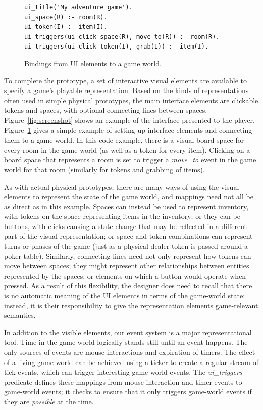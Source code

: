 \documentclass[letterpaper]{article}
\begin{document}
\begin{figure}
\begin{Verbatim}[frame=single,fontsize=\scriptsize]
ui_title('My adventure game').
ui_space(R) :- room(R).
ui_token(I) :- item(I).
ui_triggers(ui_click_space(R), move_to(R)) :- room(R).
ui_triggers(ui_click_token(I), grab(I)) :- item(I).
\end{Verbatim}
\caption{Bindings from UI elements to a game world.}
\label{fig:bindings}
\end{figure}

To complete the prototype, a set of interactive visual
elements are available to specify a game's playable representation. Based on
the kinds of representations often used in simple physical prototypes, the main
interface elements are clickable tokens and spaces, with optional connecting lines between
spaces. Figure~\ref{fig:screenshot} shows an example of the interface presented
to the player. Figure~\ref{fig:bindings} gives a simple example of setting up
interface elements and connecting them to a game world. In this
code example, there is a visual board space for every room in the game world (as well
as a token for every item).  Clicking on a board space that represents a room
is set to trigger a \emph{move\_to} event in the game world for that room (similarly for
tokens and grabbing of items).

As with actual physical prototypes, there are many ways of using the visual
elements to represent the state of the game world, and mappings need not all be
as direct as in this example. Spaces can instead be used to represent
inventory, with tokens on the space representing items in the inventory; or
they can be buttons, with clicks causing a state change that may be reflected
in a different part of the visual representation; or space and token
combinations can represent turns or phases of the game (just as a physical
dealer token is passed around a poker table). Similarly, connecting lines
need not only represent how tokens can move between spaces; they
might represent other relationships between entities represented by the spaces,
or elements on which a button would operate when pressed.  As a result of this
flexibility, the designer does need to recall that there is no automatic
meaning of the UI elements in terms of the game-world state: instead, it is
their responsibility to give the representation elements game-relevant
semantics.

In addition to the visible elements, our event system is a major
representational tool. Time in the game world logically stands still until an
event happens. The only sources of events are mouse interactions and expiration
of timers. The effect of a living game world can be achieved using a ticker to
create a regular stream of tick events, which can trigger interesting
game-world events. The \emph{ui\_triggers} predicate defines these mappings
from mouse-interaction and timer events to game-world events; it checks to
ensure that it only triggers game-world events if they are \emph{possible} at
the time.
\end{document}
